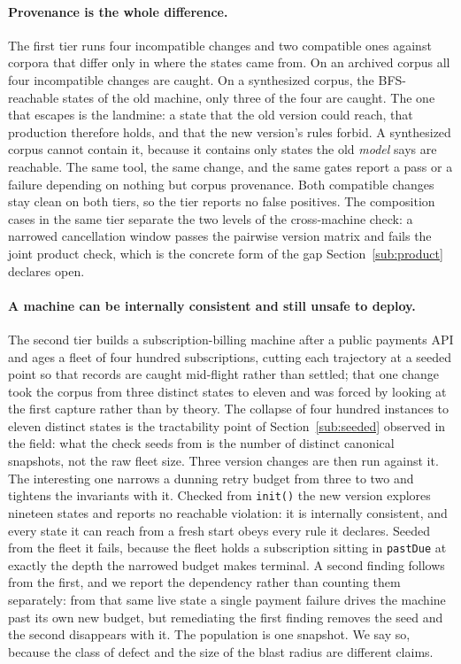 \documentclass[11pt]{article}
\newcommand{\code}[1]{\texttt{#1}}
\begin{document}
\paragraph{Provenance is the whole difference.} The first tier runs four
incompatible changes and two compatible ones against corpora that differ only in
where the states came from. On an archived corpus all four incompatible changes
are caught. On a synthesized corpus, the BFS-reachable states of the old machine,
only three of the four are caught. The one that escapes is the landmine: a state
that the old version could reach, that production therefore holds, and that the
new version's rules forbid. A synthesized corpus cannot contain it, because it
contains only states the old \emph{model} says are reachable. The same tool, the
same change, and the same gates report a pass or a failure depending on nothing
but corpus provenance. Both compatible changes stay clean on both tiers, so the
tier reports no false positives. The composition cases in the same tier separate
the two levels of the cross-machine check: a narrowed cancellation window passes
the pairwise version matrix and fails the joint product check, which is the
concrete form of the gap Section~\ref{sub:product} declares open.

\paragraph{A machine can be internally consistent and still unsafe to deploy.}
The second tier builds a subscription-billing machine after a public payments
API and ages a fleet of four hundred subscriptions, cutting each trajectory at a
seeded point so that records are caught mid-flight rather than settled; that one
change took the corpus from three distinct states to eleven and was forced by
looking at the first capture rather than by theory. The collapse of four hundred
instances to eleven distinct states is the tractability point of
Section~\ref{sub:seeded} observed in the field: what the check seeds from is the
number of distinct canonical snapshots, not the raw fleet size. Three version changes are
then run against it. The interesting one narrows a dunning retry budget from
three to two and tightens the invariants with it. Checked from \code{init()} the
new version explores nineteen states and reports no reachable violation: it is
internally consistent, and every state it can reach from a fresh start obeys
every rule it declares. Seeded from the fleet it fails, because the fleet holds a
subscription sitting in \code{pastDue} at exactly the depth the narrowed budget
makes terminal. A second finding follows from the first, and we report the
dependency rather than counting them separately: from that same live state a
single payment failure drives the machine past its own new budget, but
remediating the first finding removes the seed and the second disappears with it.
The population is one snapshot. We say so, because the class of defect and the
size of the blast radius are different claims.
\end{document}

